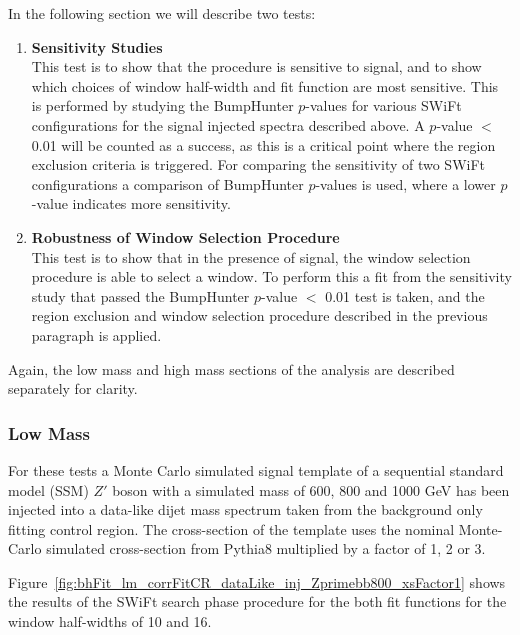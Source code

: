 \noindent
In the following section we will describe two tests:
\begin{enumerate}
  \item\textbf{Sensitivity Studies}\\
  This test is to show that the procedure is sensitive to signal,
  and to show which choices of window half-width and fit function are most sensitive.
  This is performed by studying the {\sc BumpHunter} \mbox{$p$-value}s for various SWiFt configurations for the signal injected spectra described above.
  A \mbox{$p$-value} $<$ 0.01 will be counted as a success, as this is a critical point  where the region exclusion criteria is triggered.
  For comparing the sensitivity of two SWiFt configurations a comparison of
  {\sc BumpHunter} \mbox{$p$-value}s is used, where a lower \mbox{$p$-value} indicates more sensitivity.\vspace{1em}
  
  \item\textbf{Robustness of Window Selection Procedure}\\
  This test is to show that in the presence of signal, the window selection procedure is able to select a window.
  To perform this a fit from the sensitivity study that passed the {\sc BumpHunter} \mbox{$p$-value} $<$ 0.01 test is taken,
  and the region exclusion and  window selection procedure described in the previous paragraph is applied.
\end{enumerate}

\noindent
Again, the low mass and high mass sections of the analysis are described separately for clarity.

\subsubsection{Low Mass}
\label{sec:lowmass_signalInj}

For these tests a Monte Carlo simulated signal template of a sequential standard model (SSM) $Z'$ boson with a simulated mass of 600, 800 and 1000 GeV
has been injected into a data-like dijet mass spectrum taken from the background only  fitting control region.
The cross-section of the template uses the nominal Monte-Carlo simulated cross-section from { \sc Pythia8} multiplied by a factor of 1, 2 or 3.


Figure~\ref{fig:bhFit_lm_corrFitCR_dataLike_inj_Zprimebb800_xsFactor1}  shows the results of the SWiFt search phase procedure
for the both fit functions for the window half-widths of 10 and 16.

